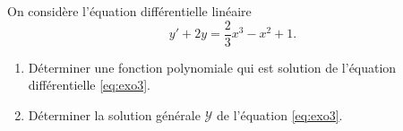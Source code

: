 
\begin{exercice}\label{exosession2-0003}

On considère l'équation différentielle linéaire 
\begin{equation}\label{eq:exo3}
  y'+2y = \frac{2}{3}x^3 -x^2 +1. 
\end{equation}
\begin{enumerate}
\item Déterminer une fonction polynomiale qui est solution de l'équation différentielle \eqref{eq:exo3}.
\item Déterminer la solution générale $\mathcal{Y}$ de l'équation \eqref{eq:exo3}.
\end{enumerate}


\end{exercice}

